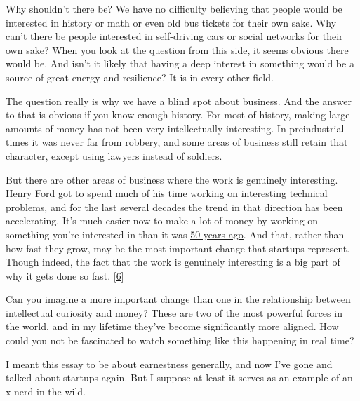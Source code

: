 Why
                  shouldn't there be? We have no difficulty believing that
                  people would be interested in history or math or even old bus
                  tickets for their own sake. Why can't there be people
                  interested in self-driving cars or social networks for their
                  own sake? When you look at the question from this side, it
                  seems obvious there would be. And isn't it likely that having
                  a deep interest in something would be a source of great energy
                  and resilience? It is in every other field.

The
                  question really is why we have a blind spot about business.
                  And the answer to that is obvious if you know enough history.
                  For most of history, making large amounts of money has not
                  been very intellectually interesting. In preindustrial times
                  it was never far from robbery, and some areas of business
                  still retain that character, except using lawyers instead of
                  soldiers.

But there are other areas of business
                  where the work is genuinely interesting. Henry Ford got to
                  spend much of his time working on interesting technical
                  problems, and for the last several decades the trend in that
                  direction has been accelerating. It's much easier now to make
                  a lot of money by working on something you're interested in
                  than it was \href{http://www.paulgraham.com/re.html}{\underline{50 years ago}}. And that, rather than how fast they grow, may be the most
                  important change that startups represent. Though indeed, the
                  fact that the work is genuinely interesting is a big part of
                  why it gets done so fast.
                  [\href{\#f6n}{6}]

Can you imagine a more important change than one
                  in the relationship between intellectual curiosity and money?
                  These are two of the most powerful forces in the world, and in
                  my lifetime they've become significantly more aligned. How
                  could you not be fascinated to watch something like this
                  happening in real time?

I meant this essay to be
                  about earnestness generally, and now I've gone and talked
                  about startups again. But I suppose at least it serves as an
                  example of an x nerd in the wild.










